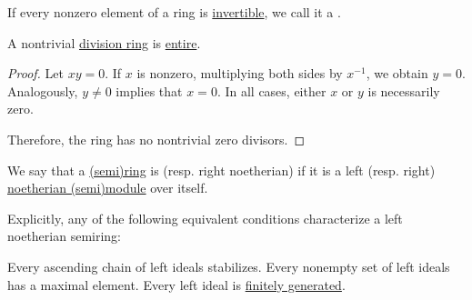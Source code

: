 \begin{definition}\label{def:division_ring}
  If every nonzero element of a ring is \hyperref[def:divisibility/unit]{invertible}, we call it a .
\end{definition}

\begin{proposition}\label{thm:division_ring_is_entire}
  A nontrivial \hyperref[def:division_ring]{division ring} is \hyperref[def:entire_semiring]{entire}.
\end{proposition}
\begin{proof}
  Let \( xy = 0 \). If \( x \) is nonzero, multiplying both sides by \( x^{-1} \), we obtain \( y = 0 \). Analogously, \( y \neq 0 \) implies that \( x = 0 \). In all cases, either \( x \) or \( y \) is necessarily zero.

  Therefore, the ring has no nontrivial zero divisors.
\end{proof}

\begin{definition}\label{def:noetherian_semiring}
  We say that a \hyperref[def:semiring]{(semi)ring} is  (resp. right noetherian) if it is a left (resp. right) \hyperref[def:noetherian_semimodule]{noetherian (semi)module} over itself.

  Explicitly, any of the following equivalent conditions characterize a left noetherian semiring:
  \begin{thmenum}
     Every ascending chain of left ideals stabilizes.
     Every nonempty set of left ideals has a maximal element.
     Every left ideal is \hyperref[def:semiring_ideal/generated]{finitely generated}.
  \end{thmenum}
\end{definition}

